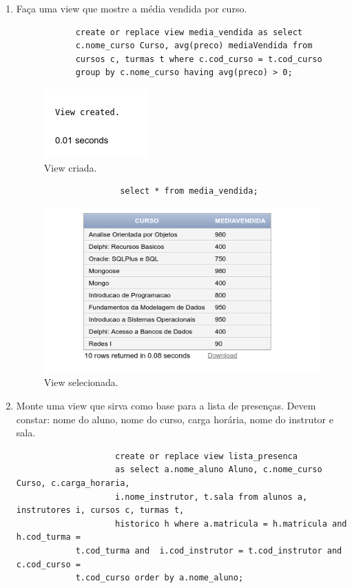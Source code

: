 \documentclass[
article,			%
11pt,				%
oneside,			%
a4paper,			%
english,			%
brazil,				%
sumario=tradicional
]{abntex2}
\begin{document}
\begin{enumerate}
						\item
						 Faça uma view que mostre a média vendida por
						curso.
					\begin{verbatim}
			create or replace view media_vendida as select
			c.nome_curso Curso, avg(preco) mediaVendida from 
			cursos c, turmas t where c.cod_curso = t.cod_curso 
			group by c.nome_curso having avg(preco) > 0;
					\end{verbatim}
							\begin{center}
							\begin{figure}[H]
								\centering
								\includegraphics[scale=0.5]{./imagens/at-05.png}
								\caption{View criada.}
								\label{rota-1}
							\end{figure}
						\end{center}
							\begin{verbatim}
					 select * from media_vendida;
						\end{verbatim}
						\begin{center}
							\begin{figure}[H]
								\centering
								\includegraphics[scale=0.5]{./imagens/at-06.png}
								\caption{View selecionada.}
								\label{rota-1}
							\end{figure}
						\end{center}
				
								\item
								Monte uma view que sirva como base para a lista
								de presenças. Devem constar: nome do aluno,
								nome do curso, carga horária, nome do instrutor e
								sala.
						\begin{verbatim}
					create or replace view lista_presenca
					as select a.nome_aluno Aluno, c.nome_curso Curso, c.carga_horaria,
					i.nome_instrutor, t.sala from alunos a, instrutores i, cursos c, turmas t,
					historico h where a.matricula = h.matricula and h.cod_turma =
			t.cod_turma and  i.cod_instrutor = t.cod_instrutor and c.cod_curso = 
			t.cod_curso order by a.nome_aluno;
					

\end{verbatim}
\end{enumerate}
\end{document}
